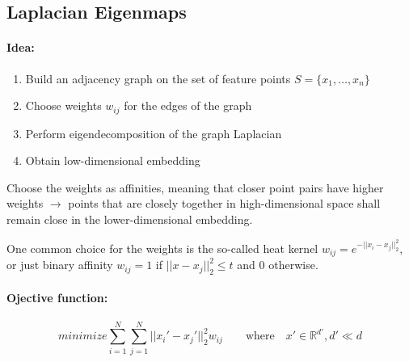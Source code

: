 
\subsection*{Laplacian Eigenmaps}

%
%
%

\paragraph{Idea:}
\begin{enumerate}
    \item Build an adjacency graph on the set of feature points \(S=\{x_1, \dots, x_n\}\)
    \item Choose weights \(w_{ij}\) for the edges of the graph
    \item Perform eigendecomposition of the graph Laplacian
    \item Obtain low-dimensional embedding
\end{enumerate}
Choose the weights as affinities, meaning that closer point pairs have higher weights \(\rightarrow\) points that are closely together in high-dimensional space shall remain close in the lower-dimensional embedding.

One common choice for the weights is the so-called heat kernel \(w_{ij} = e^{-||x_i - x_j||_2^2}\), or just binary affinity
$w_{ij} = 1$ if $ ||x-x_j||_2^2 \leq t $ and  $0$ otherwise.

\bigbreak

\paragraph{Ojective function:}
\[minimize \sum_{i=1}^{N}\sum_{j=1}^{N}||x_i'- x_j'||_2^2 w_{ij} \qquad \text{where} \quad x'\in \mathbb{R}^{d'}, d' \ll d \]

